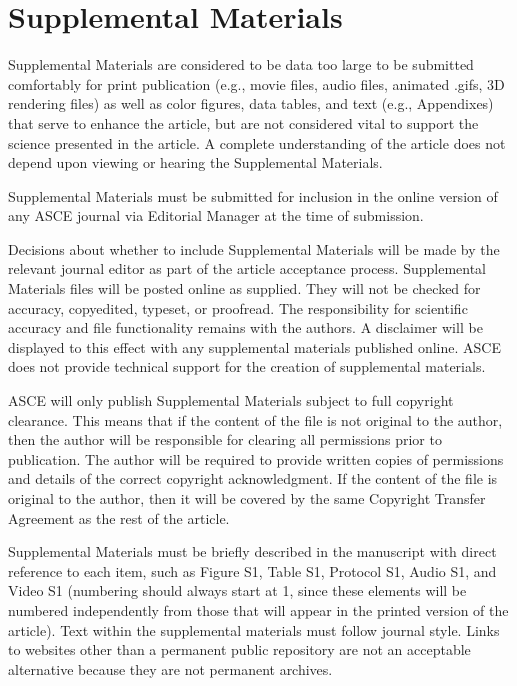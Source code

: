 \documentclass[
  NewProceedings,
  letterpaper]{./assets/ascelike-new}
\begin{document}
\hypertarget{supplemental-materials}{%
\section{Supplemental Materials}\label{supplemental-materials}}

Supplemental Materials are considered to be data too large to be
submitted comfortably for print publication (e.g., movie files, audio
files, animated .gifs, 3D rendering files) as well as color figures,
data tables, and text (e.g., Appendixes) that serve to enhance the
article, but are not considered vital to support the science presented
in the article. A complete understanding of the article does not depend
upon viewing or hearing the Supplemental Materials.

Supplemental Materials must be submitted for inclusion in the online
version of any ASCE journal via Editorial Manager at the time of
submission.

Decisions about whether to include Supplemental Materials will be made
by the relevant journal editor as part of the article acceptance
process. Supplemental Materials files will be posted online as supplied.
They will not be checked for accuracy, copyedited, typeset, or
proofread. The responsibility for scientific accuracy and file
functionality remains with the authors. A disclaimer will be displayed
to this effect with any supplemental materials published online. ASCE
does not provide technical support for the creation of supplemental
materials.

ASCE will only publish Supplemental Materials subject to full copyright
clearance. This means that if the content of the file is not original to
the author, then the author will be responsible for clearing all
permissions prior to publication. The author will be required to provide
written copies of permissions and details of the correct copyright
acknowledgment. If the content of the file is original to the author,
then it will be covered by the same Copyright Transfer Agreement as the
rest of the article.

Supplemental Materials must be briefly described in the manuscript with
direct reference to each item, such as Figure S1, Table S1, Protocol S1,
Audio S1, and Video S1 (numbering should always start at 1, since these
elements will be numbered independently from those that will appear in
the printed version of the article). Text within the supplemental
materials must follow journal style. Links to websites other than a
permanent public repository are not an acceptable alternative because
they are not permanent archives.
\end{document}
